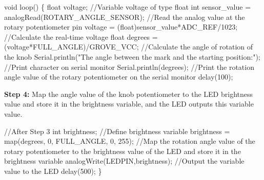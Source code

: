 \documentclass[
  letterpaper,
  DIV=11,
  numbers=noendperiod]{scrreprt}
\newenvironment{Shaded}{\begin{snugshade}}{\end{snugshade}}
\newcommand{\CommentTok}[1]{\textcolor[rgb]{0.37,0.37,0.37}{#1}}
\newcommand{\DataTypeTok}[1]{\textcolor[rgb]{0.68,0.00,0.00}{#1}}
\newcommand{\DecValTok}[1]{\textcolor[rgb]{0.68,0.00,0.00}{#1}}
\newcommand{\NormalTok}[1]{\textcolor[rgb]{0.00,0.23,0.31}{#1}}
\newcommand{\OperatorTok}[1]{\textcolor[rgb]{0.37,0.37,0.37}{#1}}
\newcommand{\StringTok}[1]{\textcolor[rgb]{0.13,0.47,0.30}{#1}}
\begin{document}
\begin{Shaded}
\begin{Highlighting}[]
\DataTypeTok{void}\NormalTok{ loop}\OperatorTok{()}
\OperatorTok{\{}   
    \DataTypeTok{float}\NormalTok{ voltage}\OperatorTok{;} \CommentTok{//Variable voltage of type float}
    \DataTypeTok{int}\NormalTok{ sensor\_value }\OperatorTok{=}\NormalTok{ analogRead}\OperatorTok{(}\NormalTok{ROTARY\_ANGLE\_SENSOR}\OperatorTok{);} \CommentTok{//Read the analog value at the rotary potentiometer pin}
\NormalTok{    voltage }\OperatorTok{=} \OperatorTok{(}\DataTypeTok{float}\OperatorTok{)}\NormalTok{sensor\_value}\OperatorTok{*}\NormalTok{ADC\_REF}\OperatorTok{/}\DecValTok{1023}\OperatorTok{;} \CommentTok{//Calculate the real{-}time voltage}
    \DataTypeTok{float}\NormalTok{ degrees }\OperatorTok{=} \OperatorTok{(}\NormalTok{voltage}\OperatorTok{*}\NormalTok{FULL\_ANGLE}\OperatorTok{)/}\NormalTok{GROVE\_VCC}\OperatorTok{;} \CommentTok{//Calculate the angle of rotation of the knob}
\NormalTok{    Serial}\OperatorTok{.}\NormalTok{println}\OperatorTok{(}\StringTok{"The angle between the mark and the starting position:"}\OperatorTok{);} \CommentTok{//Print character on serial monitor}
\NormalTok{    Serial}\OperatorTok{.}\NormalTok{println}\OperatorTok{(}\NormalTok{degrees}\OperatorTok{);} \CommentTok{//Print the rotation angle value of the rotary potentiometer on the serial monitor}
\NormalTok{    delay}\OperatorTok{(}\DecValTok{100}\OperatorTok{);}
\end{Highlighting}
\end{Shaded}

\textbf{Step 4:} Map the angle value of the knob potentiometer to the
LED brightness value and store it in the brightness variable, and the
LED outputs this variable value.

\begin{Shaded}
\begin{Highlighting}[]
\CommentTok{//After Step 3}
    \DataTypeTok{int}\NormalTok{ brightness}\OperatorTok{;} \CommentTok{//Define brightness variable}
\NormalTok{    brightness }\OperatorTok{=}\NormalTok{ map}\OperatorTok{(}\NormalTok{degrees}\OperatorTok{,} \DecValTok{0}\OperatorTok{,}\NormalTok{ FULL\_ANGLE}\OperatorTok{,} \DecValTok{0}\OperatorTok{,} \DecValTok{255}\OperatorTok{);} \CommentTok{//Map the rotation angle value of the rotary potentiometer to the brightness value of the LED and store it in the brightness variable}
\NormalTok{    analogWrite}\OperatorTok{(}\NormalTok{LEDPIN}\OperatorTok{,}\NormalTok{brightness}\OperatorTok{);} \CommentTok{//Output the variable value to the LED}
\NormalTok{    delay}\OperatorTok{(}\DecValTok{500}\OperatorTok{);}
\OperatorTok{\}}
\end{Highlighting}
\end{Shaded}
\end{document}
